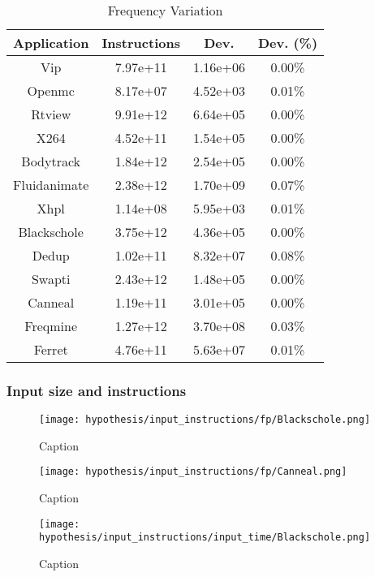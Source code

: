 \documentclass{ieeeaccess}
\begin{document}
\begin{table}[H]
\caption{Frequency Variation}
\begin{tabular}{|c|c|c|c|}
\hline
Application  & Instructions & Dev.     & Dev. (\%) \\ \hline
Vip          & 7.97e+11     & 1.16e+06 & 0.00\%    \\ \hline
Openmc       & 8.17e+07     & 4.52e+03 & 0.01\%    \\ \hline
Rtview       & 9.91e+12     & 6.64e+05 & 0.00\%    \\ \hline
X264         & 4.52e+11     & 1.54e+05 & 0.00\%    \\ \hline
Bodytrack    & 1.84e+12     & 2.54e+05 & 0.00\%    \\ \hline
Fluidanimate & 2.38e+12     & 1.70e+09 & 0.07\%    \\ \hline
Xhpl         & 1.14e+08     & 5.95e+03 & 0.01\%    \\ \hline
Blackschole  & 3.75e+12     & 4.36e+05 & 0.00\%    \\ \hline
Dedup        & 1.02e+11     & 8.32e+07 & 0.08\%    \\ \hline
Swapti       & 2.43e+12     & 1.48e+05 & 0.00\%    \\ \hline
Canneal      & 1.19e+11     & 3.01e+05 & 0.00\%    \\ \hline
Freqmine     & 1.27e+12     & 3.70e+08 & 0.03\%    \\ \hline
Ferret       & 4.76e+11     & 5.63e+07 & 0.01\%    \\ \hline
\end{tabular}
\end{table}

\subsubsection{Input size and instructions}

\begin{figure}[H]
    \centering
    \texttt{[image: hypothesis/input\_instructions/fp/Blackschole.png]}
    \caption{Caption}
    \label{fig:my_label}
\end{figure}

\begin{figure}[H]
    \centering
    \texttt{[image: hypothesis/input\_instructions/fp/Canneal.png]}
    \caption{Caption}
    \label{fig:my_label}
\end{figure}

\begin{figure}[H]
    \centering
    \texttt{[image: hypothesis/input\_instructions/input\_time/Blackschole.png]}
    \caption{Caption}
    \label{fig:my_label}
\end{figure}
\end{document}
